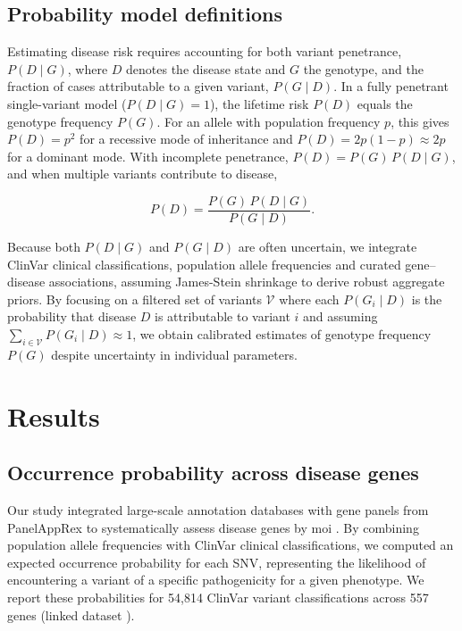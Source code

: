 \subsection{Probability model definitions}
Estimating disease risk requires accounting for both variant penetrance, $P(D\mid G)$, where $D$ denotes the disease state and $G$ the genotype, and the fraction of cases attributable to a given variant, $P(G\mid D)$. In a fully penetrant single-variant model ($P(D\mid G)=1$), the lifetime risk $P(D)$ equals the genotype frequency $P(G)$. For an allele with population frequency $p$, this gives $P(D)=p^2$ for a recessive mode of inheritance and $P(D)=2p(1-p)\approx2p$ for a dominant mode. With incomplete penetrance, $P(D)=P(G)\,P(D\mid G)$, and when multiple variants contribute to disease,  

\[
P(D)=\frac{P(G)\,P(D\mid G)}{P(G\mid D)}.
\]

Because both $P(D\mid G)$ and $P(G\mid D)$ are often uncertain, we integrate ClinVar clinical classifications, population allele frequencies and curated gene–disease associations, assuming James-Stein shrinkage to derive robust aggregate priors. By focusing on a filtered set of variants $\mathcal{V}$ where each $P(G_i\mid D)$ is the probability that disease $D$ is attributable to variant $i$ and assuming $\sum_{i\in\mathcal{V}}P(G_i\mid D)\approx1$, we obtain calibrated estimates of genotype frequency $P(G)$ despite uncertainty in individual parameters. 


\clearpage
\section{Results}
\subsection{Occurrence probability across disease genes}
\label{sec:pro_obs}
Our study integrated large-scale annotation databases with gene panels from PanelAppRex to systematically assess disease genes by \ac{moi} 
\cite{lawless_panelapprex_2025}. 
By combining population allele frequencies with ClinVar clinical classifications, we computed an expected occurrence probability for each SNV, representing the likelihood of encountering a variant of a specific pathogenicity for a given phenotype. We report these probabilities for 54,814 ClinVar variant classifications across 557 genes (linked dataset \cite{lawless_2025_15111584}).

